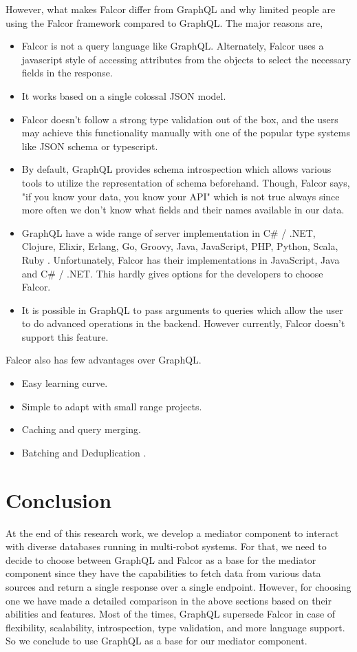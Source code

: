 	However, what makes Falcor differ from GraphQL and why limited people are using the Falcor framework compared to GraphQL. The major reasons are,
	\begin{itemize}
		\item Falcor is not a query language like GraphQL. Alternately, Falcor uses a javascript style of accessing attributes from the objects to select the necessary fields in the response.
		\item It works based on a single colossal JSON model.
		\item Falcor doesn't follow a strong type validation out of the box, and the users may achieve this functionality manually with one of the popular type systems like JSON schema or typescript.
		\item By default, GraphQL provides schema introspection which allows various tools to utilize the representation of schema beforehand. Though, Falcor says, "if you know your data, you know your API" \cite{misc04} which is not true always since more often we don't know what fields and their names available in our data.
		\item GraphQL have a wide range of server implementation in C\# / .NET, Clojure, Elixir, Erlang, Go, Groovy, Java, JavaScript, PHP, Python, Scala, Ruby \cite{misc05}. Unfortunately, Falcor has their implementations in JavaScript, Java and C\# / .NET. This hardly gives options for the developers to choose Falcor.
		\item It is possible in GraphQL to pass arguments to queries which allow the user to do advanced operations in the backend. However currently, Falcor doesn't support this feature.
	\end{itemize}

	Falcor also has few advantages over GraphQL. 
	\begin{itemize}
		\item Easy learning curve.
		\item Simple to adapt with small range projects.
		\item Caching and query merging.
		\item Batching and Deduplication \cite{misc06}.
	\end{itemize}

	\section{Conclusion} \label{sec:graphql_falcor_conclusion}
	At the end of this research work, we develop a mediator component to interact with diverse databases running in multi-robot systems. For that, we need to decide to choose between GraphQL and Falcor as a base for the mediator component since they have the capabilities to fetch data from various data sources and return a single response over a single endpoint. However, for choosing one we have made a detailed comparison in the above sections based on their abilities and features. Most of the times, GraphQL supersede Falcor in case of flexibility, scalability, introspection, type validation, and more language support. So we conclude to use GraphQL as a base for our mediator component.

